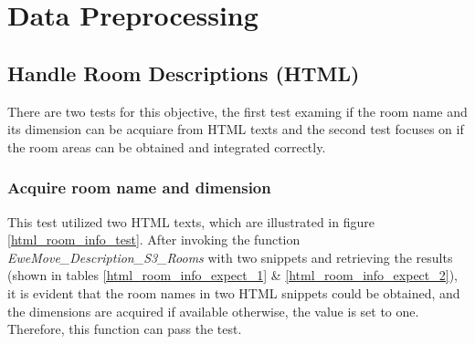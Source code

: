 \documentclass[12pt,twoside]{report}
\begin{document}
\section{Data Preprocessing}

\subsection{Handle Room Descriptions (HTML)}
There are two tests for this objective, the first test examing if the room name and its dimension can be acquiare from HTML texts and the second test focuses on if the room areas can be obtained and integrated correctly. 

\subsubsection{Acquire room name and dimension}
This test utilized two HTML texts, which are illustrated in figure \ref{html_room_info_test}. After invoking the function \textit{EweMove\_Description\_S3\_Rooms} with two snippets and retrieving the results (shown in tables \ref{html_room_info_expect_1} \& \ref{html_room_info_expect_2}), it is evident that the room names in two HTML snippets could be obtained, and the dimensions are acquired if available otherwise, the value is set to one. Therefore, this function can pass the test.
\end{document}
